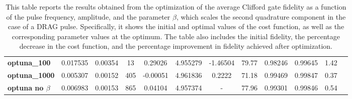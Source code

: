 \begin{table}
\begin{tabular}{lccccccccccc}
        \textbf{optuna\_100} & 0.017535 & 0.00354& 13 & 0.29026 & 4.955279 & -1.46504 & 79.77 & 0.98246 & 0.99645 & 1.42\\
        \textbf{optuna\_1000} & 0.005307 & 0.00152 & 405 & -0.00051 & 4.961836 & 0.2222 & 71.18 & 0.99469 & 0.99847 & 0.37\\
        \textbf{optuna no $\beta$} & 0.006983 & 0.00153 & 865 & 0.04104 & 4.957374 & - & 77.96 & 0.99301 & 0.99846 & 0.54\\
        \bottomrule
    \end{tabular}
    \caption{This table reports the results obtained from the optimization of the average Clifford gate fidelity as a function of the pulse frequency, amplitude, and the parameter $\beta$, which scales the second quadrature component in the case of a DRAG pulse.
    Specifically, it shows the initial and optimal values of the cost function, as well as the corresponding parameter values at the optimum. 
    The table also includes the initial fidelity, the percentage decrease in the cost function, and the percentage improvement in fidelity achieved after optimization.}
    \label{tab:best_values}
\end{table}

